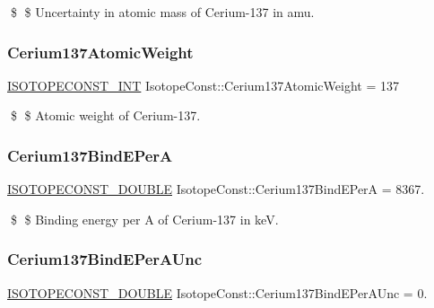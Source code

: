 \$ \$ Uncertainty in atomic mass of Cerium-\/137 in amu. \mbox{\label{group___isotope_const-_cerium-_ce137_gad97ec2de878b7311ae7112dc012c27ae}} 
\subsubsection{\texorpdfstring{Cerium137\+Atomic\+Weight}{Cerium137AtomicWeight}}
{\footnotesize\ttfamily \mbox{\hyperlink{group___isotope_const-_macros_ga5f18360b3e99483a35c32d789e62621c}{I\+S\+O\+T\+O\+P\+E\+C\+O\+N\+S\+T\+\_\+\+I\+NT}} Isotope\+Const\+::\+Cerium137\+Atomic\+Weight = 137}

\$ \$ Atomic weight of Cerium-\/137. \mbox{\label{group___isotope_const-_cerium-_ce137_ga250cb878f7b6ebae81cefc2649f2ba39}} 
\subsubsection{\texorpdfstring{Cerium137\+Bind\+E\+PerA}{Cerium137BindEPerA}}
{\footnotesize\ttfamily \mbox{\hyperlink{group___isotope_const-_macros_ga8f45a7272ce02c0b4c65c44636ed719a}{I\+S\+O\+T\+O\+P\+E\+C\+O\+N\+S\+T\+\_\+\+D\+O\+U\+B\+LE}} Isotope\+Const\+::\+Cerium137\+Bind\+E\+PerA = 8367.}

\$ \$ Binding energy per A of Cerium-\/137 in keV. \mbox{\label{group___isotope_const-_cerium-_ce137_gac57ee9b510562e2ab7eb963ff25280fe}} 
\subsubsection{\texorpdfstring{Cerium137\+Bind\+E\+Per\+A\+Unc}{Cerium137BindEPerAUnc}}
{\footnotesize\ttfamily \mbox{\hyperlink{group___isotope_const-_macros_ga8f45a7272ce02c0b4c65c44636ed719a}{I\+S\+O\+T\+O\+P\+E\+C\+O\+N\+S\+T\+\_\+\+D\+O\+U\+B\+LE}} Isotope\+Const\+::\+Cerium137\+Bind\+E\+Per\+A\+Unc = 0.}

